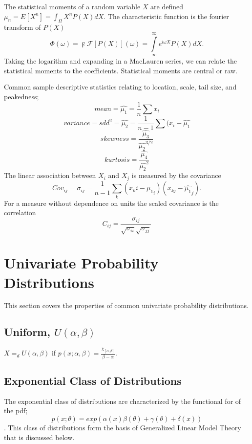
The statistical moments of a random variable $X$ are defined $\mu_n = E [ X^n] = \int_\Omega X^n P(X)dX$.  The characteristic function is the fourier transform of $P(X)$ \[\Phi(\omega)=\digamma \mathcal{F} [P(X)] (\omega) = \int\limits_{\infty}^{\infty} e^{i \omega X} P(X) dX.\]  Taking the logarithm and expanding in a MacLauren series, we can relate the statistical moments to the coefficients. Statistical moments are central or raw.

Common sample descriptive statistics relating to location, scale, tail size,  and peakedness;
\[ mean = \hat{\mu_1} = \frac{1}{n}\sum x_i  \]
\[ variance = sdd^2 =  \hat{\mu_2} = \frac{1}{n-1} \sum (x_i- \hat{\mu_1}\]
\[ skewness = \frac{ \hat{\mu_3}}{\hat{\mu_2}^{3/2}} \]
\[ kurtosis = \frac{\hat{\mu_4}}{\hat{\mu_2}^2} \]
The linear association between $X_i$ and $X_j$ is measured by the covariance \[ Cov_{ij} = \sigma_{ij} = \frac{1}{n-1} \sum_k (x_ki - \hat{\mu_1}_i)(x_{kj} - \hat{\mu_1}_j). \]  For a measure without dependence on units the scaled covariance is the correlation \[C_{ij} =\frac{\sigma_{ij}}{\sqrt{\sigma_{ii}}\sqrt{\sigma_{jj}}}\]

\section{Univariate Probability Distributions}
This section covers the properties of common univariate
probability distributions.

\subsection{Uniform,  $U(\alpha,\beta)$}
$X=_d U(\alpha,\beta)$ if $p(x; \alpha, \beta)=
\frac{\chi_{[\alpha,\beta]}}{\beta-\alpha}.$

\subsection{Exponential Class of Distributions}
The exponential class of distributions are characterized by the
functional for of the pdf; \[ p(x;\theta) =
exp(\alpha(x)\beta(\theta)+\gamma(\theta)+\delta(x) ) \].  This
class of distributions form the basis of Generalized Linear
Model Theory that is discussed below.

